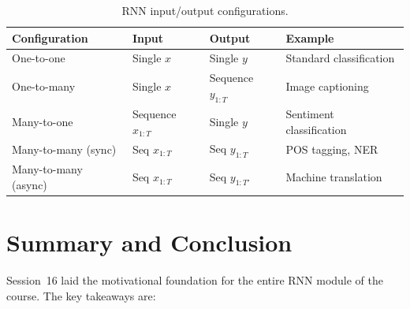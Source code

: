 \documentclass[12pt,a4paper]{article}
\begin{document}
\begin{table}[ht]
  \centering
  \caption{RNN input/output configurations.}
  \label{tab:io_configs}
  \begin{tabularx}{\linewidth}{lllX}
    \toprule
    \textbf{Configuration} & \textbf{Input} & \textbf{Output} & \textbf{Example} \\
    \midrule
    One-to-one   & Single $x$      & Single $y$       & Standard classification \\
    One-to-many  & Single $x$      & Sequence $y_{1:T}$ & Image captioning \\
    Many-to-one  & Sequence $x_{1:T}$ & Single $y$    & Sentiment classification \\
    Many-to-many (sync) & Seq $x_{1:T}$ & Seq $y_{1:T}$ & POS tagging, NER \\
    Many-to-many (async) & Seq $x_{1:T}$ & Seq $y_{1:T'}$ & Machine translation \\
    \bottomrule
  \end{tabularx}
\end{table}

\section{Summary and Conclusion}
\label{sec:conclusion}

Session~16 laid the motivational foundation for the entire RNN module of the
course.  The key takeaways are:
\end{document}
